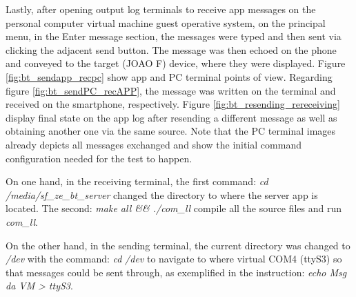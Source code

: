 Lastly, after opening output log terminals to receive app messages on the personal computer virtual machine guest operative system, on the principal menu, in the Enter message section, the messages were typed and then sent via clicking the adjacent send button. The message was then echoed on the phone and conveyed to the target (JOAO F) device, where they were displayed. Figure \ref{fig:bt_sendapp_recpc} show app and PC terminal points of view. Regarding figure \ref{fig:bt_sendPC_recAPP}, the message was written on the terminal and received on the smartphone, respectively. Figure \ref{fig:bt_resending_rereceiving} display final state on the app log after resending a different message as well as obtaining another one via the same source. Note that the PC terminal images already depicts all messages exchanged and show the initial command configuration needed for the test to happen.

On one hand, in the receiving terminal, the first command:  \emph{cd} \emph{/media/sf\_ze\_bt\_server}
changed the directory to where the server app is located. The second:  \emph{make all \&\& ./com\_ll} compile all the source files and run \emph{com\_ll}.

On the other hand, in the sending terminal, the current directory was changed to \emph{/dev} with the command:  \emph{cd}  \emph{/dev}
to navigate to where virtual COM4 (ttyS3) so that messages could be sent through, as exemplified in the instruction:  \emph{echo Msg da VM}  \emph{> ttyS3}. 
